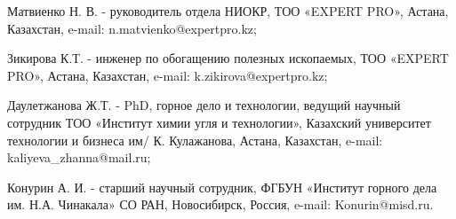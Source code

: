 \begin{info}
Матвиенко Н. В. - руководитель отдела НИОКР, ТОО «EXPERT PRO», Астана,
Казахстан, e-mail:
n.matvienko@expertpro.kz;

Зикирова К.Т. - инженер по обогащению полезных ископаемых, ТОО «EXPERT
PRO», Астана, Казахстан, e-mail:
k.zikirova@expertpro.kz;

Даулетжанова Ж.Т. - PhD, горное дело и технологии, ведущий научный
сотрудник ТОО «Институт химии угля и технологии», Казахский университет
технологии и бизнеса им/ К. Кулажанова, Астана, Казахстан, e-mail:
kaliyeva\_zhanna@mail.ru;

Конурин А. И. - старший научный сотрудник, ФГБУН «Институт горного дела
им. Н.А. Чинакала» СО РАН, Новосибирск, Россия, e-mail: Konurin@misd.ru.
\end{info}
